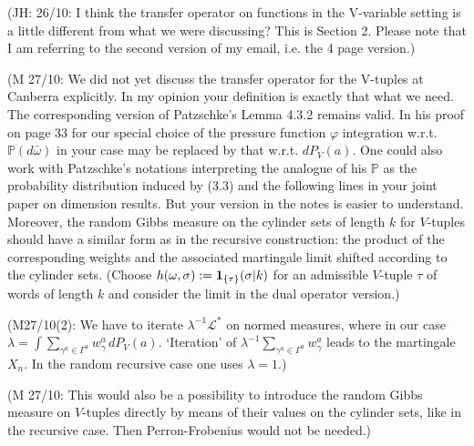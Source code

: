 \documentclass[a4paper]{amsart}
\theoremstyle{plain}
\theoremstyle{definition}
\theoremstyle{remark}
\begin{document}
(JH: 26/10: I think the transfer operator on functions in the V-variable setting is a little different from what we were discussing?  This is Section 2.   Please note that I am referring to the second version of my email, i.e. the 4 page version.) 

(M 27/10: We did not yet discuss the transfer operator for the V-tuples at Canberra explicitly. In my opinion your definition is exactly that what we need.
The corresponding version of Patzschke's Lemma 4.3.2 remains valid. In his proof on page 33 for our special choice of the pressure function $\varphi$ integration w.r.t.\ $\mathbb{P}(d\bar{ \omega}) $ in your case may be replaced by that w.r.t. $dP_V(a)$. One could also work with Patzschke's notations interpreting the analogue of his $\mathbb{P}$ as the probability distribution induced by (3.3) and the following lines in your joint paper on dimension results.
But your version in the notes is easier to understand. Moreover, the random Gibbs measure on the cylinder sets of length $k$ for $V$-tuples should have a similar form as in the recursive construction: the product of the corresponding weights and the associated martingale limit shifted according to the cylinder sets. (Choose $h(\omega,\sigma):={\bf 1}_{\{\tau\}}(\sigma |k)$ for an admissible $V$-tuple $\tau$ of words of length $k$ and consider the limit in the dual operator version.)

(M27/10(2): We have to iterate $\lambda^{-1} \mathcal{L}^*$ on normed measures, where in our case
$\lambda=\int \sum_{\gamma^a\in\Gamma^a} w^a_\gamma\, dP_V(a)$.
`Iteration' of  $\lambda^{-1}\sum_{\gamma^a\in \Gamma^a} w^a_\gamma$
leads to the martingale $X_n$. In the random recursive case one uses $\lambda=1$.)

(M 27/10: This would also be a possibility to introduce the random Gibbs measure on $V$-tuples directly by means of their values on the cylinder sets, like in the recursive case. Then Perron-Frobenius would not be needed.) 
\end{document}
